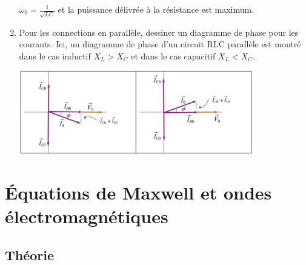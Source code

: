 \documentclass[a4paper]{article}
\begin{document}
\begin{enumerate}
$\displaystyle \omega_0 = \frac{1}{\sqrt{LC}} $ et la puissance délivrée à la résistance est maximum.
    \item Pour les connections en parallèle, dessiner un diagramme de phase pour les courants. Ici, un diagramme de phase d'un circuit 
RLC parallèle est montré dans le cas inductif $ X_L > X_C $ et dans le cas capacitif $ X_L < X_C $.
\begin{center}
\includegraphics[width=0.8\textwidth]{ac4.PNG}
\end{center}
\end{enumerate}

























\section{Équations de Maxwell et ondes électromagnétiques}














\subsection{Théorie}
\end{document}
